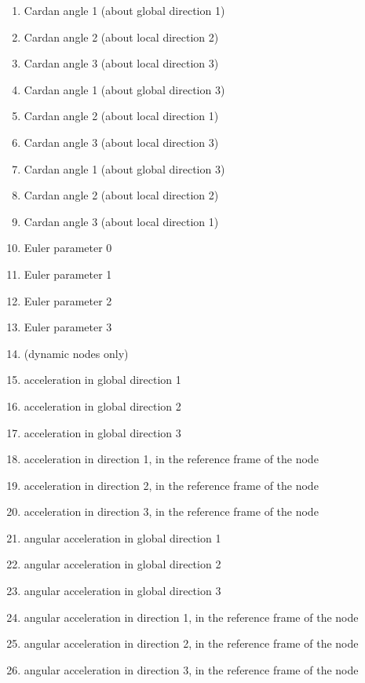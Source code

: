 \begin{enumerate}
\item {} Cardan angle 1 (about global direction 1)
\item {} Cardan angle 2 (about local direction 2)
\item {} Cardan angle 3 (about local direction 3)
\item {} Cardan angle 1 (about global direction 3)
\item {} Cardan angle 2 (about local direction 1)
\item {} Cardan angle 3 (about local direction 3)
\item {} Cardan angle 1 (about global direction 3)
\item {} Cardan angle 2 (about local direction 2)
\item {} Cardan angle 3 (about local direction 1)
\item {} Euler parameter 0
\item {} Euler parameter 1
\item {} Euler parameter 2
\item {} Euler parameter 3
\item[] (dynamic nodes only)
\item {} acceleration in global direction 1
\item {} acceleration in global direction 2
\item {} acceleration in global direction 3
\item {} acceleration in direction 1, in the reference frame of the node
\item {} acceleration in direction 2, in the reference frame of the node
\item {} acceleration in direction 3, in the reference frame of the node
\item {} angular acceleration in global direction 1
\item {} angular acceleration in global direction 2
\item {} angular acceleration in global direction 3
\item {} angular acceleration in direction 1, in the reference frame of the node
\item {} angular acceleration in direction 2, in the reference frame of the node
\item {} angular acceleration in direction 3, in the reference frame of the node
\end{enumerate}


